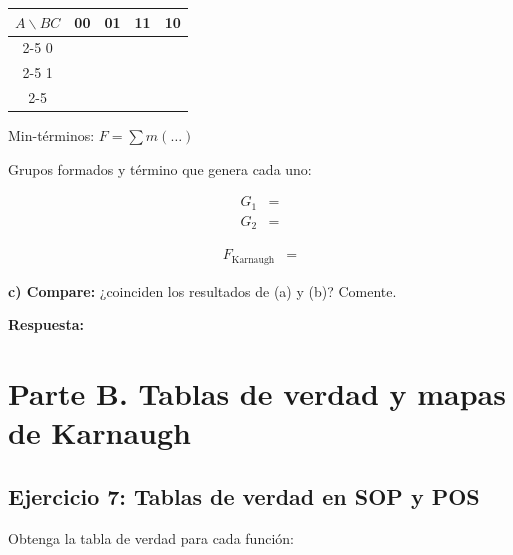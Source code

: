 \documentclass[11pt]{article}
\makeatletter
\newcommand{\kc}[2]{\makebox[1.2cm][c]{\rule[-0.55cm]{0pt}{1.2cm}\in@{,#1,}{,#2,}\ifin@ 1\else 0\fi}}
\newcommand{\kmapthree}[1]{\begin{center}\begin{tabular}{c|*{4}{c|}}\multicolumn{1}{c}{$A\backslash BC$}&\multicolumn{1}{c}{00}&\multicolumn{1}{c}{01}&\multicolumn{1}{c}{11}&\multicolumn{1}{c}{10}\\\cline{2-5} 0&\kc{0}{#1}&\kc{1}{#1}&\kc{3}{#1}&\kc{2}{#1}\\\cline{2-5} 1&\kc{4}{#1}&\kc{5}{#1}&\kc{7}{#1}&\kc{6}{#1}\\\cline{2-5}\end{tabular}\end{center}}
\makeatother
\begin{document}
\kmapthree{}

Min-términos: \(F=\sum m(\ldots)\)

Grupos formados y término que genera cada uno:

\begin{align*}
  G_1 &= \\
  G_2 &=
\end{align*}

\begin{align*}
  F_{\text{Karnaugh}} &=
\end{align*}

\textbf{c) Compare:} ¿coinciden los resultados de (a) y (b)? Comente.

\textbf{Respuesta:}

\vspace{1.5cm}

\section{Parte B. Tablas de verdad y mapas de Karnaugh}
\label{sec:orgd63b5d9}
\subsection{Ejercicio 7: Tablas de verdad en SOP y POS}
\label{sec:org6f19b11}
Obtenga la tabla de verdad para cada función:
\end{document}
